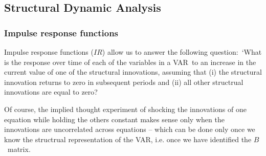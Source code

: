 \documentclass[10pt]{article}
\begin{document}
\subsection{Structural Dynamic Analysis}

\subsubsection{Impulse response functions}

Impulse response functions ($IR$) allow us to answer the following
question:\ `What is the response over time of each of the variables in a
VAR\ to an increase in the current value of one of the structural
innovations, assuming that (i) the structural innovation returns to zero in
subsequent periods and (ii) all other structrual innovations are equal to
zero?

Of course, the implied thought experiment of shocking the innovations of one
equation while holding the others constant makes sense only when the
innovations are uncorrelated across equations -- which can be done only once
we know the structrual representation of the VAR, i.e. once we have
identified the $B$\ matrix.
\end{document}

